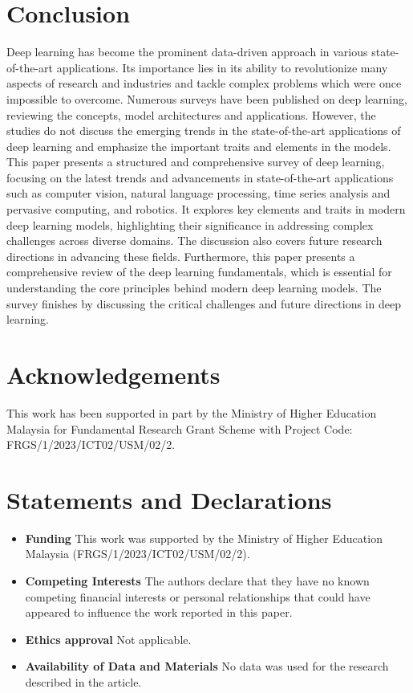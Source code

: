 \documentclass[preprint,12pt]{elsarticle}
\begin{document}
\section{Conclusion}\label{sec6}
Deep learning has become the prominent data-driven approach in various state-of-the-art applications. Its importance lies in its ability to revolutionize many aspects of research and industries and tackle complex problems which were once impossible to overcome. Numerous surveys have been published on deep learning, reviewing the concepts, model architectures and applications. However, the studies do not discuss the emerging trends in the state-of-the-art applications of deep learning and emphasize the important traits and elements in the models. This paper presents a structured and comprehensive survey of deep learning, focusing on the latest trends and advancements in state-of-the-art applications such as computer vision, natural language processing, time series analysis and pervasive computing, and robotics. It explores key elements and traits in modern deep learning models, highlighting their significance in addressing complex challenges across diverse domains. The discussion also covers future research directions in advancing these fields. Furthermore, this paper presents a comprehensive review of the deep learning fundamentals, which is essential for understanding the core principles behind modern deep learning models. The survey finishes by discussing the critical challenges and future directions in deep learning.

\section*{Acknowledgements}
This work has been supported in part by the Ministry of Higher Education Malaysia for Fundamental Research Grant Scheme with Project Code: FRGS/1/2023/ICT02/USM/02/2.


\section*{Statements and Declarations}
\begin{itemize}
\item \textbf{Funding} This work was supported by the Ministry of Higher Education Malaysia (FRGS/1/2023/ICT02/USM/02/2).
\item \textbf{Competing Interests} The authors declare that they have no known competing financial interests or personal relationships that could have appeared to influence the work reported in this paper.
\item \textbf{Ethics approval} Not applicable.
\item \textbf{Availability of Data and Materials} No data was used for the research described in the article.
\end{itemize}
\end{document}
